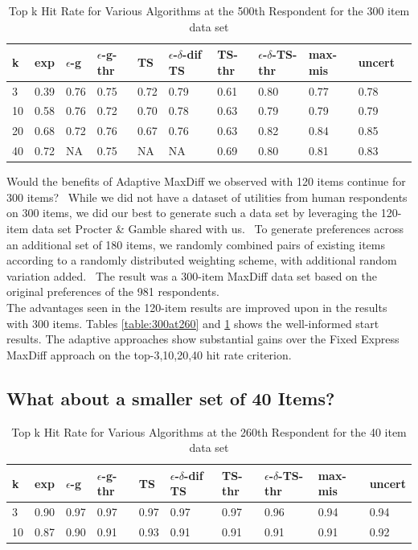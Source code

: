\documentclass[a4paper,12pt]{article}
\newcommand{\fixedexpressS}{\textbf{exp}}
\newcommand{\egreedyS}{$\epsilon$-\textbf{g}}
\newcommand{\egreedythresS}{$\epsilon$-\textbf{g-thr}}
\newcommand{\misminS}{\textbf{max-mis}}
\newcommand{\tsS}{\textbf{TS} }
\newcommand{\edtsS}{$\epsilon$-$\delta$-\textbf{dif TS} }
\newcommand{\tsthresS}{\textbf{TS-thr} }
\newcommand{\edtsthresS}{$\epsilon$-$\delta$-\textbf{TS-thr} }
\newcommand{\uncertS}{\textbf{uncert} }
\begin{document}
\begin{table}
\begin{center}
\begin{tabular}{lllllllllll}
\hline   k &  \fixedexpressS & \egreedyS&\egreedythresS&\tsS&\edtsS&\tsthresS&\edtsthresS& \misminS& \uncertS  \\ \hline  
3 & 0.39 &  0.76 & 0.75 & 0.72 & 0.79 & 0.61 &  0.80 &  0.77 &0.78 \\
10 &  0.58 &   0.76 & 0.72 & 0.70 & 0.78 & 0.63 & 0.79 & 0.79 &   0.79\\
20 & 0.68 & 0.72 & 0.76 & 0.67 & 0.76 &  0.63 & 0.82 & 0.84 &    0.85 \\ 
40 & 0.72 &   NA & 0.75 & NA & NA & 0.69 & 0.80 &0.81 & 0.83 \end{tabular}
\end{center}
\caption{Top k Hit Rate for Various Algorithms at the 500th Respondent for the 300 item data set}
\label{table:300at500}
\end{table}
Would the benefits of Adaptive MaxDiff we observed with 120 items continue for 300 items?  While we did not have a dataset of utilities from human respondents on 300 items, we did our best to generate such a data set by leveraging the 120-item data set Procter \& Gamble shared with us.  To generate preferences across an additional set of 180 items, we randomly combined pairs of existing items according to a randomly distributed weighting scheme, with additional random variation added.  The result was a 300-item MaxDiff data set based on the original preferences of the 981 respondents.\\
The advantages seen in the 120-item results are improved upon in the results with 300 items. Tables \ref{table:300at260} and \ref{table:300at500} shows the well-informed start results. The adaptive approaches show substantial gains over the Fixed Express MaxDiff approach on the top-3,10,20,40 hit rate criterion.\\
\subsection{What about a smaller set of 40 Items?}
\begin{table}
\begin{center}
\begin{tabular}{llllllllll}
\hline   k &  \fixedexpressS & \egreedyS&\egreedythresS&\tsS&\edtsS&\tsthresS&\edtsthresS& \misminS& \uncertS  \\ \hline  3 & 0.90 & 0.97 &  0.97 &  0.97 & 0.97 & 0.97 &  0.96 & 0.94 &  0.94 \\  10 & 0.87 & 0.90 & 0.91 &  0.93 & 0.91 & 0.91 & 0.91 & 0.91 &  0.92  \end{tabular}
\end{center}
\caption{Top k Hit Rate for Various Algorithms at the 260th Respondent for the 40 item data set}
\label{table:40at260}
\end{table}
\end{document}
